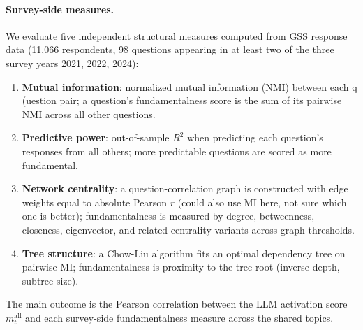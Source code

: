 \paragraph{Survey-side measures.}
We evaluate five independent structural measures computed from GSS response data (11,066 respondents, 98 questions appearing in at least two of the three survey years 2021, 2022, 2024):
\begin{enumerate}[label=(\arabic*)]
    \item \textbf{Mutual information}: normalized mutual information (NMI) between each q (uestion pair; a question's fundamentalness score is the sum of its pairwise NMI across all other questions.
    \item \textbf{Predictive power}: out-of-sample $R^2$ when predicting each question's responses from all others; more predictable questions are scored as more fundamental.
    \item \textbf{Network centrality}: a question-correlation graph is constructed with edge weights equal to absolute Pearson $r$ (could also use MI here,  not sure which one is better); fundamentalness is measured by degree, betweenness, closeness, eigenvector, and related centrality variants across graph thresholds.
    \item \textbf{Tree structure}: a Chow-Liu algorithm fits an optimal dependency tree on pairwise MI; fundamentalness is proximity to the tree root (inverse depth, subtree size).
\end{enumerate}
The main outcome is the Pearson correlation between the LLM activation score $m^\text{all}_t$ and each survey-side fundamentalness measure across the shared topics.
